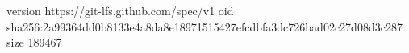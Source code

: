 version https://git-lfs.github.com/spec/v1
oid sha256:2a99364dd0b8133e4a8da8e18971515427efcdbfa3dc726bad02c27d08d3c287
size 189467
